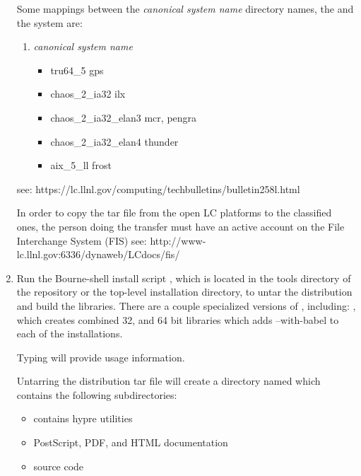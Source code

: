 \begin{enumerate}
   Some mappings between the  \textit{canonical system name}
   directory names, the  and the system are:
\begin{enumerate}
   \item \textit{canonical system name}         
   \begin{itemize}
   \item  {}        tru64\_5               gps
   \item  {}       chaos\_2\_ia32         ilx
   \item  {}    chaos\_2\_ia32\_elan3  mcr, pengra
   \item  {}          chaos\_2\_ia32\_elan4  thunder
   \item  {}    aix\_5\_ll             frost
   \end{itemize}
\end{enumerate}
   see: 
{https://lc.llnl.gov/computing/techbulletins/bulletin258l.html}

   In order to copy the tar file from the open LC platforms to the classified 
   ones, the person doing the transfer must have an active account on the File
   Interchange System (FIS) see: 
{http://www-lc.llnl.gov:6336/dynaweb/LCdocs/fis/}

   \item Run the Bourne-shell install script , which is located in 
   the tools directory of the \hypre{} repository or the top-level installation 
   directory, to untar the distribution and build the \hypre{} libraries. 
   There are a couple specialized versions of , including:
   , which creates combined 32, and 64 bit libraries
    which adds --with-babel to each of the installations. 

   Typing  will provide usage information. 
  
   Untarring the distribution tar file will create a directory named 
   which contains the following subdirectories:
      \begin{itemize}
       \item {}     contains hypre utilities
       \item {}    PostScript, PDF, and HTML documentation
       \item {}     source code
      \end{itemize}


\end{enumerate}
